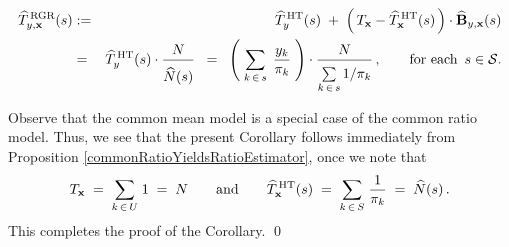 \begin{corollary}
\begin{eqnarray*}
\widehat{T}^{\,\textnormal{RGR}}_{y,\mathbf{x}}(s)
& := &
	\widehat{T}^{\,\textnormal{HT}}_{y}(s)
	\; + \;
	\left(\,T_{\mathbf{x}} - \widehat{T}^{\,\textnormal{HT}}_{\mathbf{x}}(s) \,\right)
	\cdot
	\widehat{\mathbf{B}}_{y,\mathbf{x}}(s)
\\
& = &
	\widehat{T}^{\,\textnormal{HT}}_{y}(s)
	\cdot
	\dfrac{
		N
	}{
		\overset{{\color{white}.}}{\widehat{N}(s)}
	}
\;\; = \;\;
	\left(\; \underset{k\,\in\,s}{\sum}\;\, \dfrac{ y_{k} }{ \pi_{k} } \;\right)
	\cdot
	\dfrac{
		N
		}{
		\underset{k\,\in\,s}{\overset{{\color{white}.}}{\sum}}\, 1/\pi_{k}
		}
	\,,\quad\quad\textnormal{for each \,$s \in \mathcal{S}$}.
\end{eqnarray*}
\end{corollary}
\proof
Observe that {\color{red}the common mean model is a special case of the common ratio model}.
Thus, we see that the present Corollary follows immediately from
Proposition \ref{commonRatioYieldsRatioEstimator},
once we note that
\begin{equation*}
	T_{\mathbf{x}}
	\; = \; \underset{k\,\in\,U}{\sum}\;1
	\; = \; N
\quad\quad\textnormal{and}\quad\quad
	\widehat{T}^{\,\textnormal{HT}}_{\mathbf{x}}(s)
	\; = \; \underset{k\,\in\,S}{\sum}\;\dfrac{1}{\pi_{k}}
	\; = \; \widehat{N}(s)\,.
\end{equation*}
This completes the proof of the Corollary.
\qed


\renewcommand{\theenumi}{\roman{enumi}}
\renewcommand{\labelenumi}{\textnormal{(\theenumi)}$\;\;$}

